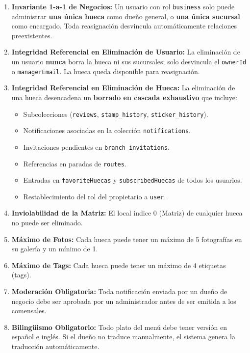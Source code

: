 \documentclass[11pt, a4paper, oneside]{report}
\begin{document}
\begin{enumerate}
  \item \textbf{Invariante 1-a-1 de Negocios:} Un usuario con rol \texttt{business} solo puede administrar \textbf{una única hueca} como dueño general, o \textbf{una única sucursal} como encargado. Toda reasignación desvincula automáticamente relaciones preexistentes.

  \item \textbf{Integridad Referencial en Eliminación de Usuario:} La eliminación de un usuario \textbf{nunca} borra la hueca ni sus sucursales; solo desvincula el \texttt{ownerId} o \texttt{managerEmail}. La hueca queda disponible para reasignación.

  \item \textbf{Integridad Referencial en Eliminación de Hueca:} La eliminación de una hueca desencadena un \textbf{borrado en cascada exhaustivo} que incluye:
  \begin{itemize}
    \item Subcolecciones (\texttt{reviews}, \texttt{stamp\_history}, \texttt{sticker\_history}).
    \item Notificaciones asociadas en la colección \texttt{notifications}.
    \item Invitaciones pendientes en \texttt{branch\_invitations}.
    \item Referencias en paradas de \texttt{routes}.
    \item Entradas en \texttt{favoriteHuecas} y \texttt{subscribedHuecas} de todos los usuarios.
    \item Restablecimiento del rol del propietario a \texttt{user}.
  \end{itemize}

  \item \textbf{Inviolabilidad de la Matriz:} El local índice 0 (Matriz) de cualquier hueca no puede ser eliminado.

  \item \textbf{Máximo de Fotos:} Cada hueca puede tener un máximo de 5 fotografías en su galería y un mínimo de 1.

  \item \textbf{Máximo de Tags:} Cada hueca puede tener un máximo de 4 etiquetas (tags).

  \item \textbf{Moderación Obligatoria:} Toda notificación enviada por un dueño de negocio debe ser aprobada por un administrador antes de ser emitida a los comensales.

  \item \textbf{Bilingüismo Obligatorio:} Todo plato del menú debe tener versión en español e inglés. Si el dueño no traduce manualmente, el sistema genera la traducción automáticamente.
\end{enumerate}
\end{document}
